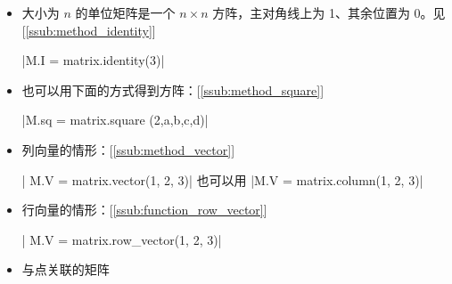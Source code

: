 \begin{itemize}
\item  大小为 {$\displaystyle n$} 的单位矩阵是一个 {$\displaystyle n\times n$} 方阵，主对角线上为 1、其余位置为 0。见 [\ref{ssub:method_identity}]

\begin{mybox}
|M.I = matrix.identity(3)|
\end{mybox}


\begin{tkzexample}[latex=.5\textwidth]
\end{tkzexample}


\item  也可以用下面的方式得到方阵：[\ref{ssub:method_square}]
  \begin{mybox}
  |M.sq = matrix.square (2,a,b,c,d)|
  \end{mybox}

\begin{tkzexample}[latex=.5\textwidth]
\end{tkzexample}


\item  列向量的情形：[\ref{ssub:method_vector}]

  \begin{mybox}
  | M.V = matrix.vector(1, 2, 3)|
  也可以用 |M.V = matrix.column(1, 2, 3)|
  \end{mybox}


\begin{tkzexample}[latex=.5\textwidth]
\end{tkzexample}


\item  行向量的情形：[\ref{ssub:function_row_vector}]

\begin{mybox}
  | M.V = matrix.row_vector(1, 2, 3)|
\end{mybox}

\begin{tkzexample}[latex=.5\textwidth]
\end{tkzexample}


\item  与点关联的矩阵


\end{itemize}
